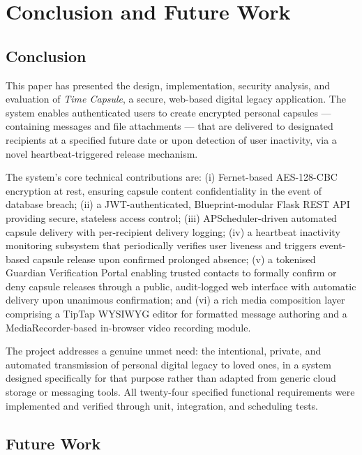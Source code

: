 \documentclass[12pt, a4paper]{article}
\begin{document}
\section{Conclusion and Future Work}
\label{sec:conclusion}

\subsection{Conclusion}

This paper has presented the design, implementation, security analysis, and evaluation of \textit{Time Capsule}, a secure, web-based digital legacy application. The system enables authenticated users to create encrypted personal capsules — containing messages and file attachments — that are delivered to designated recipients at a specified future date or upon detection of user inactivity, via a novel heartbeat-triggered release mechanism.

The system's core technical contributions are: (i) Fernet-based AES-128-CBC encryption at rest, ensuring capsule content confidentiality in the event of database breach; (ii) a JWT-authenticated, Blueprint-modular Flask REST API providing secure, stateless access control; (iii) APScheduler-driven automated capsule delivery with per-recipient delivery logging; (iv) a heartbeat inactivity monitoring subsystem that periodically verifies user liveness and triggers event-based capsule release upon confirmed prolonged absence; (v) a tokenised Guardian Verification Portal enabling trusted contacts to formally confirm or deny capsule releases through a public, audit-logged web interface with automatic delivery upon unanimous confirmation; and (vi) a rich media composition layer comprising a TipTap WYSIWYG editor for formatted message authoring and a MediaRecorder-based in-browser video recording module.

The project addresses a genuine unmet need: the intentional, private, and automated transmission of personal digital legacy to loved ones, in a system designed specifically for that purpose rather than adapted from generic cloud storage or messaging tools. All twenty-four specified functional requirements were implemented and verified through unit, integration, and scheduling tests.

\subsection{Future Work}
\end{document}
